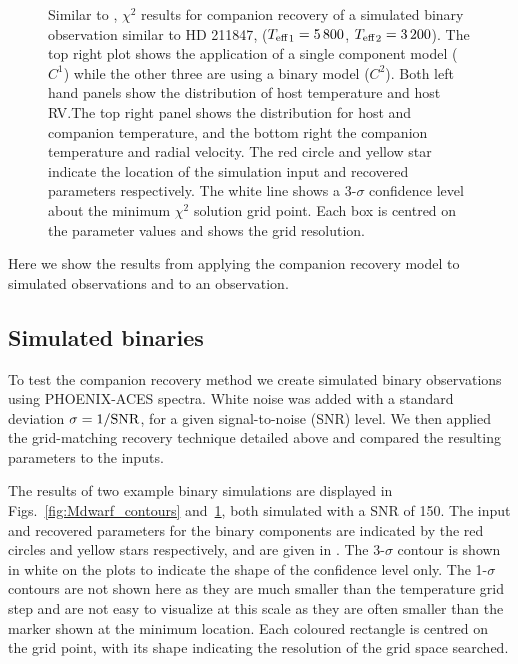 \begin{figure*}
    \centering
    \caption{Similar to , \(\chi^2\) results for companion recovery of a simulated binary observation similar to {HD 211847}, (\({T_{\mathrm{eff}}}_{1} = 5\,800\)\K{}, \({T_{\mathrm{eff}}}_{2}=3\,200\)\K{}). The top right plot shows the application of a single component model (\(C^1\)) while the other three are using a binary model (\(C^2\)). Both left hand panels show the distribution of host temperature and host {RV}.\@ The top right panel shows the distribution for host and companion temperature, and the bottom right the companion temperature and radial velocity.
        The red circle and yellow star indicate the location of the simulation input and recovered parameters respectively.
        The white line shows a 3-\(\sigma\) confidence level about the minimum \(\chi^2\) solution grid point. Each box is centred on the parameter values and shows the grid resolution.}
    \label{fig:HD211847_simulated_contours}
\end{figure*}
Here we show the results from applying the companion recovery model to simulated observations and to an observation.


\subsection{Simulated binaries}
\label{subsec:simulated_binaries}
To test the companion recovery method we create simulated binary observations using {PHOENIX-ACES} spectra. White noise was added with a standard deviation \(\rm \sigma = 1/{SNR}\), for a given signal-to-noise ({SNR}) level. We then applied the grid-matching recovery technique detailed above and compared the resulting parameters to the inputs.

The results of two example binary simulations are displayed in Figs.~\ref{fig:Mdwarf_contours} and~\ref{fig:HD211847_simulated_contours}, both simulated with a {SNR} of 150. The input and recovered parameters for the binary components are indicated by the red circles and yellow stars respectively, and are given in .
The 3-\(\sigma\) contour is shown in white on the plots to indicate the shape of the confidence level only. The 1-\(\sigma\) contours are not shown here as they are much smaller than the temperature grid step and are not easy to visualize at this scale as they are often smaller than the marker shown at the minimum location. Each coloured rectangle is centred on the grid point, with its shape indicating the resolution of the grid space searched.

